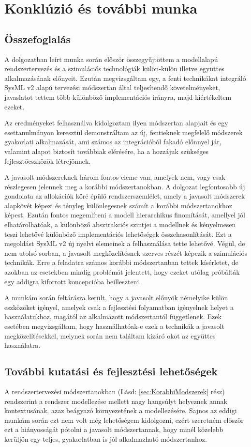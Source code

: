 \chapter{Konklúzió és további munka}

\section{Összefoglalás}
A dolgozatban leírt munka során először összegyűjtöttem a modellalapú rendszertervezés és a szimulációs technológiák külön-külön illetve együttes alkalmazásának előnyeit.
Ezután megvizsgáltam egy, a fenti technikákat integráló SysML v2 alapú tervezési módszertan által teljesítendő követelményeket, javaslatot tettem több különböző implementációs irányra, majd kiértékeltem ezeket.

Az eredményeket felhasználva kidolgoztam ilyen módszertan alapjait és egy esettanulmányon keresztül demonstráltam az új, fentieknek megfelelő módszerek gyakorlati alkalmazását, ami számos az integrációból fakadó előnnyel jár, valamint alapot biztosít továbbiak elérésére, ha a hozzájuk szükséges fejlesztőeszközök létrejönnek.

A javasolt módszereknek három fontos eleme van, amelyek nem, vagy csak részlegesen jelennek meg a korábbi módszertanokban.
A dolgozat legfontosabb új gondolata az allokációk köré épülő rendszerszemlélet, amely a javasolt módszerek alapkövét képezi és tényleg különlegesnek számít a korábbi módszertanokhoz képest.
Ezután fontos megemlíteni a modell hierarchikus finomítását, amellyel jól elhatárolhatóak, a különböző absztrakciós szintjei a modellnek és kényelmesen teszi lehetővé különböző implementációs lehetőségek összehasonlítását. Ezt a megoldást SysML v2 új nyelvi elemeinek a felhasználása tette lehetővé.
Végül, de nem utolsó sorban, a javasolt megközelítésnek szerves részét képezik a szimulációs technikák. Erre a feladatra számos korábbi módszertanban tettek kísérletet, de azokban az esetekben mindig problémát jelentett, hogy ezeket utólag próbálták egy addigra kiforrott koncepcióba beilleszteni.

A munkám során feltárásra került, hogy a javasolt előnyök némelyike külön eszközöket igényel, amelyek csak a fejlesztési folyamatban igényelnek helyet a használatukhoz, magától az alkalmazott módszertantól függetlenek.
Ezek esetében megvizsgáltam, hogy használhatóak-e ezek a technikák a javasolt megközelítésekkel, melynek során nem találtam kizáró okot az együttes használatra.

\section{További kutatási és fejlesztési lehetőségek}
A rendszertervezési módszertanokban (Lásd: \ref{sec:KorabbiModszerek} rész) rendszerint a rendszer modellezése mellett nagy hangsúlyt helyeznek annak kontextusának, azaz beágyazó környezetének a modellezésére. Sajnos az eddigi munkám során ezt nem volt még lehetőségem kidolgozni, ezért szeretném először ezt a hiányosságát pótolni a javasolt módszertannak, hogy minél közelebb kerüljön egy teljes, gyakorlatban is jól alkalmazható módszertanhoz.

